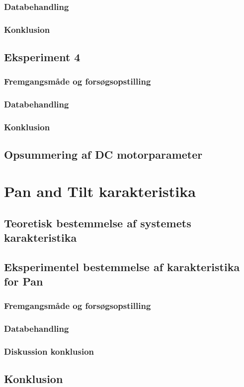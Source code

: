 \subsubsection{Databehandling}
\subsubsection{Konklusion}


\subsection{Eksperiment 4}
\subsubsection{Fremgangsmåde og forsøgsopstilling}
\subsubsection{Databehandling}

\subsubsection{Konklusion}

\subsection{Opsummering af DC motorparameter}



\section{Pan and Tilt karakteristika}
\subsection{Teoretisk bestemmelse af systemets karakteristika}

\subsection{Eksperimentel bestemmelse af karakteristika for Pan}
\subsubsection{Fremgangsmåde og forsøgsopstilling}
\subsubsection{Databehandling}
\subsubsection{Diskussion konklusion}

\subsection{Konklusion}
	

